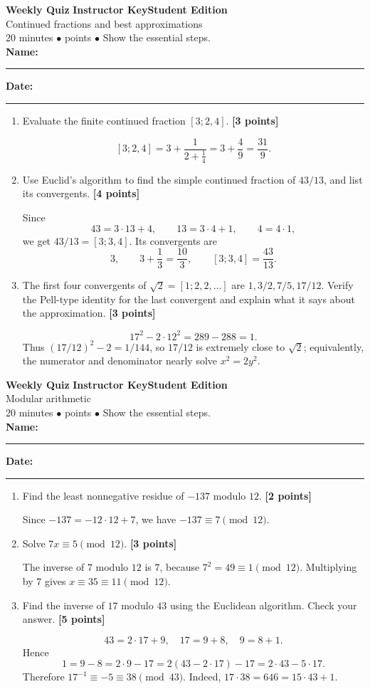 \documentclass[11pt]{article}
\newcounter{quiznum}
\newcommand{\edition}{\ifanswers Instructor Key\else Student Edition\fi}
\newcommand{\points}[1]{\hfill{\small\color{coral}\textbf{[#1 points]}}}
\newcommand{\quizheading}[1]{%
  \clearpage\stepcounter{quiznum}%
  \begin{tcolorbox}[
    enhanced,colback=paper,colframe=navy,boxrule=1.1pt,arc=2mm,
    left=4mm,right=4mm,top=2.5mm,bottom=2.5mm,
    borderline west={4pt}{0pt}{teal}]
    {\Large\bfseries\color{navy}Weekly Quiz \thequiznum}\hfill
    {\bfseries\color{teal}\edition}\\[-1pt]
    {\large\color{ink}#1}\\[2pt]
    {\small\color{muted}20 minutes \quad $\bullet$ \quad 10 points \quad $\bullet$ \quad Show the essential steps.}
    \ifanswers\else
      \\[5pt]\textbf{Name:}\ \rule{0.48\linewidth}{0.4pt}\hfill
      \textbf{Date:}\ \rule{0.20\linewidth}{0.4pt}
    \fi
  \end{tcolorbox}
}
\begin{document}
\quizheading{Continued fractions and best approximations}
\begin{enumerate}
  \item Evaluate the finite continued fraction $[3;2,4]$. \points{3}
  \begin{solution}[1.05in]
    \[
      [3;2,4]=3+\frac{1}{2+\frac14}
      =3+\frac49=\frac{31}{9}.
    \]
  \end{solution}

  \item Use Euclid's algorithm to find the simple continued fraction of $43/13$,
  and list its convergents. \points{4}
  \begin{solution}[1.5in]
    Since
    \[
      43=3\cdot13+4,\qquad 13=3\cdot4+1,\qquad 4=4\cdot1,
    \]
    we get $43/13=[3;3,4]$. Its convergents are
    \[
      3,\qquad 3+\frac13=\frac{10}{3},\qquad [3;3,4]=\frac{43}{13}.
    \]
  \end{solution}

  \item The first four convergents of $\sqrt2=[1;2,2,\ldots]$ are
  $1,3/2,7/5,17/12$. Verify the Pell-type identity for the last convergent and
  explain what it says about the approximation. \points{3}
  \begin{solution}[1.3in]
    \[
      17^2-2\cdot12^2=289-288=1.
    \]
    Thus $(17/12)^2-2=1/144$, so $17/12$ is extremely close to $\sqrt2$;
    equivalently, the numerator and denominator nearly solve $x^2=2y^2$.
  \end{solution}
\end{enumerate}

\quizheading{Modular arithmetic}
\begin{enumerate}
  \item Find the least nonnegative residue of $-137$ modulo $12$. \points{2}
  \begin{solution}[0.85in]
    Since $-137=-12\cdot12+7$, we have $-137\equiv7\pmod{12}$.
  \end{solution}

  \item Solve $7x\equiv5\pmod{12}$. \points{3}
  \begin{solution}[1.05in]
    The inverse of $7$ modulo $12$ is $7$, because $7^2=49\equiv1\pmod{12}$.
    Multiplying by $7$ gives $x\equiv35\equiv11\pmod{12}$.
  \end{solution}

  \item Find the inverse of $17$ modulo $43$ using the Euclidean algorithm.
  Check your answer. \points{5}
  \begin{solution}[1.65in]
    \[
      43=2\cdot17+9,\quad17=9+8,\quad9=8+1.
    \]
    Hence
    \[
      1=9-8=2\cdot9-17=2(43-2\cdot17)-17=2\cdot43-5\cdot17.
    \]
    Therefore $17^{-1}\equiv-5\equiv38\pmod{43}$. Indeed,
    $17\cdot38=646=15\cdot43+1$.
  \end{solution}
\end{enumerate}
\end{document}
